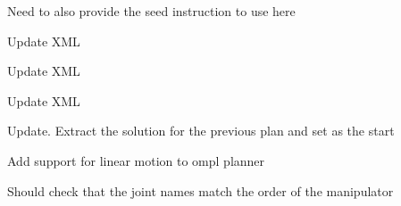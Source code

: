 \begin{DoxyRefList}
\label{todo__todo000020}%
%
Need to also provide the seed instruction to use here  
\item[Member \mbox{\hyperlink{classtesseract__planning_1_1OMPLDefaultPlanProfile_a46c010d4fcdb918631ac92016d3bfccd}{tesseract\+\_\+planning\+::OMPLDefault\+Plan\+Profile\+::OMPLDefault\+Plan\+Profile}} (const tinyxml2\+::\+XMLElement \&xml\+\_\+element)]\label{todo__todo000016}%
%
Update XML 

\label{todo__todo000017}%
%
Update XML  
\item[Member \mbox{\hyperlink{classtesseract__planning_1_1OMPLDefaultPlanProfile_a9ceeaf8d8a01e483992a71b15cb32df4}{tesseract\+\_\+planning\+::OMPLDefault\+Plan\+Profile\+::to\+XML}} (tinyxml2\+::\+XMLDocument \&doc) const override]\label{todo__todo000021}%
%
Update XML  
\item[Member \mbox{\hyperlink{classtesseract__planning_1_1OMPLMotionPlanner_a26896a1ffb6a331553b3e7dec2af8684}{tesseract\+\_\+planning\+::OMPLMotion\+Planner\+::create\+Problems}} (const \mbox{\hyperlink{structtesseract__planning_1_1PlannerRequest}{Planner\+Request}} \&request) const]\label{todo__todo000014}%
%
Update. Extract the solution for the previous plan and set as the start 

\label{todo__todo000013}%
%
Add support for linear motion to ompl planner 

\label{todo__todo000012}%
%
Should check that the joint names match the order of the manipulator 


\end{DoxyRefList}

